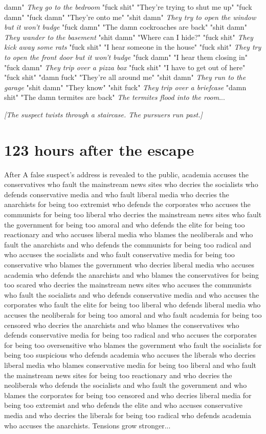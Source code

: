\documentclass{report}
\begin{document}
damn" \textit{They go to the bedroom} "fuck shit" "They're trying to shut me up" "fuck damn" \textit{} "fuck damn" "They're onto me" "shit damn" \textit{They try to open the window but it won't budge} "fuck damn" "The damn cockroaches are back" "shit damn" \textit{They wander to the basement} "shit damn" "Where can I hide?" "fuck shit" \textit{They kick away some rats} "fuck shit" "I hear someone in the house" "fuck shit" \textit{They try to open the front door but it won't budge} "fuck damn" "I hear them closing in" "fuck damn" \textit{They trip over a pizza box} "fuck shit" "I have to get out of here" "fuck shit" \textit{} "damn fuck" "They're all around me" "shit damn" \textit{They run to the garage} "shit damn" "They know" "shit fuck" \textit{They trip over a briefcase} "damn shit" "The damn termites are back" \textit{The termites flood into the room}...

\textit{[The suspect twists through a staircase. The pursuers run past.]}


\section*{123 \small{hours after the escape}}

After A false suspect's address is revealed to the public, academia accuses the conservatives who fault the mainstream news sites who decries the socialists who defends conservative media and who fault liberal media who decries the anarchists for being too extremist who defends the corporates who accuses the communists for being too liberal who decries the mainstream news sites who fault the government for being too amoral and who defends the elite for being too reactionary and who accuses liberal media who blames the neoliberals and who fault the anarchists and who defends the communists for being too radical and who accuses the socialists and who fault conservative media for being too conservative who blames the government who decries liberal media who accuses academia who defends the anarchists and who blames the conservatives for being too scared who decries the mainstream news sites who accuses the communists who fault the socialists and who defends conservative media and who accuses the corporates who fault the elite for being too liberal who defends liberal media who accuses the neoliberals for being too amoral and who fault academia for being too censored who decries the anarchists and who blames the conservatives who defends conservative media for being too radical and who accuses the corporates for being too oversensitive who blames the government who fault the socialists for being too suspicious who defends academia who accuses the liberals who decries liberal media who blames conservative media for being too liberal and who fault the mainstream news sites for being too reactionary and who decries the neoliberals who defends the socialists and who fault the government and who blames the corporates for being too censored and who decries liberal media for being too extremist and who defends the elite and who accuses conservative media and who decries the liberals for being too radical who defends academia who accuses the anarchists. Tensions grow stronger...
\end{document}
